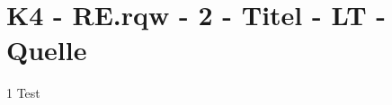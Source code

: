\section{K4 - RE.rqw - 2 - Titel - LT - Quelle}

\begin{langesbeispiel} \item[1] %
Test
\end{langesbeispiel}